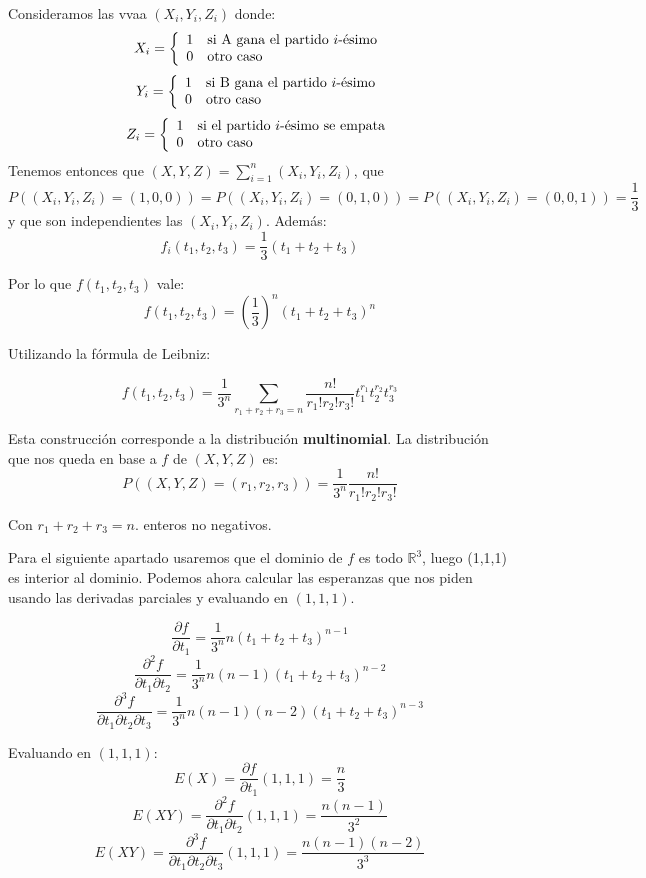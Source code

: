 \documentclass[openany]{book}
\begin{document}
\begin{exercise}
    Consideramos las vvaa $ (X_i,Y_i,Z_i) $ donde:
    $$ X_i = \left\{
    \begin{array}{ll}
        1 & \text{si A gana el partido $ i$-ésimo}\\ 
        0 & \text{otro caso}
    \end{array}
    \right. $$
    $$ Y_i = \left\{
    \begin{array}{ll}
        1 & \text{si B gana el partido $ i$-ésimo}\\ 
        0 & \text{otro caso}
    \end{array}
    \right. $$
    $$ Z_i = \left\{
    \begin{array}{ll}
        1 & \text{si el partido $ i$-ésimo se empata}\\ 
        0 & \text{otro caso}
    \end{array}
    \right. $$
    Tenemos entonces que $ (X,Y,Z) = \sum\limits_{i=1}^{n}(X_i,Y_i,Z_i) $, que $ P((X_i,Y_i,Z_i)=(1,0,0)) = P((X_i,Y_i,Z_i)=(0,1,0)) = P((X_i,Y_i,Z_i)=(0,0,1)) = \dfrac{1}{3} $ y que son independientes las $ (X_i,Y_i,Z_i) $. Además:
    $$ f_i(t_1,t_2,t_3) = \dfrac{1}{3}(t_1+t_2+t_3) $$

    Por lo que $ f(t_1,t_2,t_3) $ vale:
    $$ f(t_1,t_2,t_3) = \left( \dfrac{1}{3}  \right)^{n} (t_1+t_2+t_3)^{n}  $$

    Utilizando la fórmula de Leibniz:

    $$ f(t_1,t_2,t_3) = \dfrac{1}{3^{n}} \sum\limits_{r_1+r_2+r_3=n}^{} \dfrac{n!}{r_1!r_2!r_3!} t_1^{r_1}t_2^{r_2}t_3^{r_3} $$

    Esta construcción corresponde a la distribución \textbf{multinomial}. La distribución que nos queda en base a $ f $ de $ (X,Y,Z)  $ es:
    $$ P((X,Y,Z)=(r_1,r_2,r_3)) = \dfrac{1}{3^{n}} \dfrac{n!}{r_1!r_2!r_3!} $$

    Con $ r_1+r_2+r_3=n $. enteros no negativos.

    Para el siguiente apartado usaremos que el dominio de $ f $ es todo $ \mathbb{R}^3 $, luego (1,1,1) es interior al dominio. Podemos ahora calcular las esperanzas que nos piden usando las derivadas parciales y evaluando en $ (1,1,1) $.

    $$ \dfrac{\partial f}{\partial t_1} = \dfrac{1}{3^{n}}n (t_1+t_2+t_3)^{n-1}  $$
    $$ \dfrac{\partial ^2f}{\partial t_1 \partial t_2} = \dfrac{1}{3^{n}}n(n-1) (t_1+t_2+t_3)^{n-2} $$
    $$ \dfrac{\partial ^3f}{\partial t_1 \partial t_2 \partial t_3} = \dfrac{1}{3^{n}}n(n-1)(n-2) (t_1+t_2+t_3)^{n-3} $$

    Evaluando en $ (1,1,1) $:
    $$ E(X) = \dfrac{\partial f}{\partial t_1}(1,1,1) = \dfrac{n}{3}  $$
    $$ E(XY) = \dfrac{\partial ^2 f}{\partial t_1 \partial t_2} (1,1,1) = \dfrac{n(n-1)}{3^2} $$
    $$ E(XY) = \dfrac{\partial ^3 f}{\partial t_1 \partial t_2 \partial t_3} (1,1,1) = \dfrac{n(n-1)(n-2)}{3^3} $$

\end{exercise}
\end{document}
